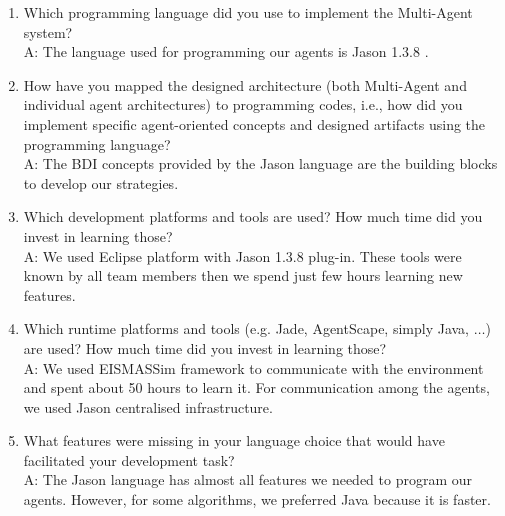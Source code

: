 \begin{enumerate}
	\item  Which programming language did you use to implement the Multi-Agent system?\\
	A: The language used for programming our agents is Jason 1.3.8 \cite{bordini:2007}.%
	
	\item  How have you mapped the designed architecture (both Multi-Agent and individual agent architectures) to programming codes, i.e., how did you implement specific agent-oriented concepts and designed artifacts using the programming language?\\
	A: The BDI concepts provided by the Jason language are the building blocks to develop our strategies.%
	
	\item  Which development platforms and tools are used? How much time did you invest in learning those?\\
	A: We used Eclipse platform with Jason 1.3.8 plug-in. These tools were known by all team members then we spend just few hours learning new features. %
	
	\item  Which runtime platforms and tools (e.g. Jade, AgentScape, simply Java, $\ldots$) are used? How much time did you invest in learning those?\\
	A: We used EISMASSim framework to communicate with the environment and spent about 50 hours to learn it. For communication among the agents, we used Jason centralised infrastructure.%
		
	\item  What features were missing in your language choice that would have facilitated your development task?\\
	A: The Jason language has almost all features we needed to program our agents. However, for some algorithms, we preferred Java because it is faster.%
	

\end{enumerate}
